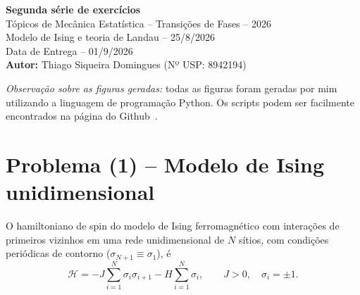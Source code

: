 \documentclass[11pt,a4paper]{article}
\begin{document}
%
\begin{center}
    {\Large \textbf{Segunda série de exercícios}}\\[0.6cm]
    {\large Tópicos de Mecânica Estatística -- Transições de Fases -- 2026}\\[0.2cm]
    {\large Modelo de Ising e teoria de Landau -- 25/8/2026}\\[0.4cm]
    {\large Data de Entrega -- 01/9/2026}\\[0.2cm]
    {\Large \textbf{Autor:} Thiago Siqueira Domingues (Nº USP: 8942194)}
\end{center}
%
\vspace{0.3cm}

\noindent\textit{Observação sobre as figuras geradas:} todas as figuras foram geradas por mim utilizando a linguagem de programação Python. Os scripts podem ser facilmente encontrados na página do Github~\cite{domingues2026statmech}. 
%
\vspace{0.3cm}
\section*{Problema (1) -- Modelo de Ising unidimensional}
%
O hamiltoniano de spin do modelo de Ising ferromagnético com interações de primeiros vizinhos em uma rede unidimensional de $N$ sítios, com condições periódicas de contorno ($\sigma_{N+1}\equiv\sigma_1$), é
%
\begin{equation}
    \mathcal H = -J\sum_{i=1}^N \sigma_i\sigma_{i+1} - H\sum_{i=1}^N\sigma_i,
    \qquad J>0,\quad \sigma_i=\pm1.
    \label{eq:ising_H}
\end{equation}
%
\end{document}
